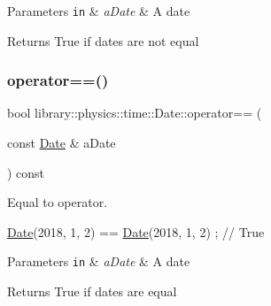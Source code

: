 \begin{DoxyParams}[1]{Parameters}
\mbox{\tt in}  & {\em a\+Date} & A date \\
\hline
\end{DoxyParams}
\begin{DoxyReturn}{Returns}
True if dates are not equal 
\end{DoxyReturn}
\mbox{\label{classlibrary_1_1physics_1_1time_1_1_date_a7a9c09059b4a55e857fac908a52a2451}} 
\subsubsection{\texorpdfstring{operator==()}{operator==()}}
{\footnotesize\ttfamily bool library\+::physics\+::time\+::\+Date\+::operator== (\begin{DoxyParamCaption}\item[{const \hyperlink{classlibrary_1_1physics_1_1time_1_1_date}{Date} \&}]{a\+Date }\end{DoxyParamCaption}) const}



Equal to operator. 


\begin{DoxyCode}
\hyperlink{classlibrary_1_1physics_1_1time_1_1_date_a08e7d804b40b1bfaacbccd32cf79f292}{Date}(2018, 1, 2) == \hyperlink{classlibrary_1_1physics_1_1time_1_1_date_a08e7d804b40b1bfaacbccd32cf79f292}{Date}(2018, 1, 2) ; \textcolor{comment}{// True}
\end{DoxyCode}



\begin{DoxyParams}[1]{Parameters}
\mbox{\tt in}  & {\em a\+Date} & A date \\
\hline
\end{DoxyParams}
\begin{DoxyReturn}{Returns}
True if dates are equal 
\end{DoxyReturn}
\mbox{\label{classlibrary_1_1physics_1_1time_1_1_date_a5bb194b5e97902e690bc216574396db1}} 
